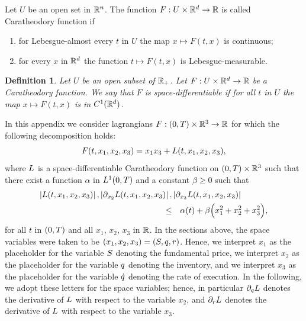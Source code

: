\documentclass[10pt,a4paper]{article}
\newtheorem{defi}[thm]{Definition}
\begin{document}
\begin{appendices}
Let $U$ be an open set in $\mathbb{R}^{n}$. The function $F:U\times \mathbb{R}^{d} \rightarrow \mathbb{R}$ is called Caratheodory function  if
\begin{enumerate}
	\item for Lebesgue-almost every $t$ in $U$ the map $x \mapsto F(t,x)$ is continuous;
	\item for every $x$ in $\mathbb{R}^{d}$ the function $t\mapsto F(t,x)$ is Lebesgue-measurable. 
\end{enumerate}
\begin{defi}
	Let  $U$ be an open subset of $\mathbb{R}_+$. Let $F:U\times \mathbb{R}^{d} \rightarrow \mathbb{R}$ be a  Caratheodory function. We say that $F$ is space-differentiable if for all $t$ in $U$ the map $x\mapsto F(t,x)$ is in $C^{1}(\mathbb{R}^{d})$. 
\end{defi}
In this appendix we consider lagrangians $F:(0,T)\times \mathbb{R}^{3} \rightarrow \mathbb{R}$ for which the following decomposition holds:
\begin{equation}\label{eq.abstractDecompositionOfLagrangian}
F(t,x_1,x_2,x_3) = x_1 x_3 + L (t,x_1,x_2,x_3),
\end{equation}
where $L$ is a space-differentiable Caratheodory function on $(0,T)\times \mathbb{R}^{3}$ such that  there exist a function $\alpha$ in $L^{1}(0,T)$ and a constant $\beta\geq 0$ such that 
\begin{equation}
\label{eq.growthConditionOnLarangian}
\begin{split}
\left\lvert {L(t,x_1,x_2,x_3)} \right\rvert, 
\left\lvert {\partial_{x_2}L(t,x_1,x_2,x_3)} \right\rvert, &
\left\lvert {\partial_{x_3}L(t,x_1,x_2,x_3)} \right\rvert\\
\leq & \quad  \alpha(t) + \beta\Big(x_1^{2} + x_2^{2} + x_3^{2}\Big),
\end{split}
\end{equation}
for all $t$ in $(0,T)$ and all $x_1$,  $x_2$, $x_3$ in $\mathbb{R}$. 
In the sections above, the space variables were taken to be $(x_1,x_2,x_3) = (S,q,r)$. Hence, we interpret $x_1$ as the placeholder for the variable $S$ denoting the fundamental price, we interpret $x_2$ as the placeholder for the variable $q$ denoting the inventory, and we interpret $x_3$ as the placeholder for the variable $\dot{q}$ denoting the rate of execution. In the following, we adopt these letters for the space variables; hence, in particular $\partial_q L$ denotes the derivative of $L$ with respect to the variable $x_2$, and $\partial_r L$ denotes the derivative of $L$ with respect to the variable $x_3$.


\end{appendices}
\end{document}
